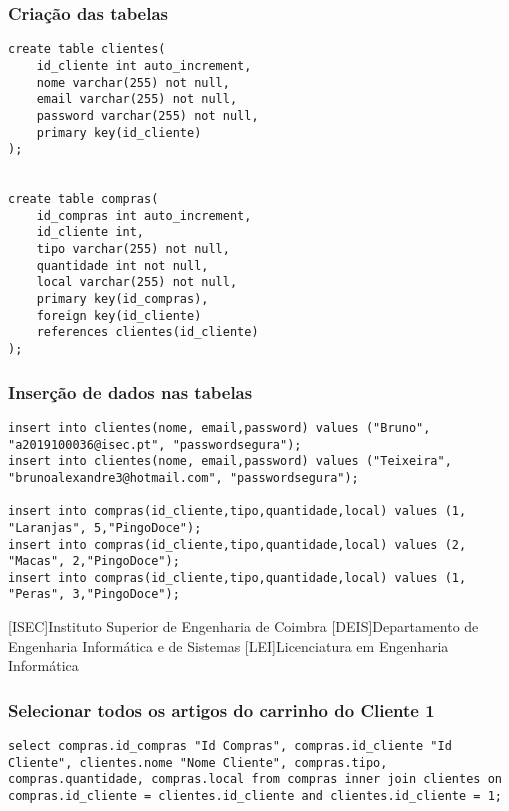 \documentclass{report}
\begin{document}
\subsubsection{Criação das tabelas}
\begin{lstlisting}
create table clientes(
    id_cliente int auto_increment,
    nome varchar(255) not null,
    email varchar(255) not null,
    password varchar(255) not null,
    primary key(id_cliente)
);


create table compras(
    id_compras int auto_increment,
    id_cliente int,
    tipo varchar(255) not null,
    quantidade int not null,
    local varchar(255) not null,
    primary key(id_compras),
    foreign key(id_cliente)
    references clientes(id_cliente)
);

\end{lstlisting}

\subsubsection{Inserção de dados nas tabelas}
\begin{lstlisting}
insert into clientes(nome, email,password) values ("Bruno", "a2019100036@isec.pt", "passwordsegura");
insert into clientes(nome, email,password) values ("Teixeira", "brunoalexandre3@hotmail.com", "passwordsegura");

insert into compras(id_cliente,tipo,quantidade,local) values (1, "Laranjas", 5,"PingoDoce");
insert into compras(id_cliente,tipo,quantidade,local) values (2, "Macas", 2,"PingoDoce");
insert into compras(id_cliente,tipo,quantidade,local) values (1, "Peras", 3,"PingoDoce");
\end{lstlisting}

\begin{acronym}
[ISEC]{Instituto Superior de Engenharia de Coimbra}
[DEIS]{Departamento de Engenharia Informática e de Sistemas}
[LEI]{Licenciatura em Engenharia Informática}
\end{acronym}

\subsubsection{Selecionar todos os artigos do carrinho do Cliente 1}
\begin{lstlisting}
select compras.id_compras "Id Compras", compras.id_cliente "Id Cliente", clientes.nome "Nome Cliente", compras.tipo, compras.quantidade, compras.local from compras inner join clientes on compras.id_cliente = clientes.id_cliente and clientes.id_cliente = 1;
\end{lstlisting}
\end{document}
